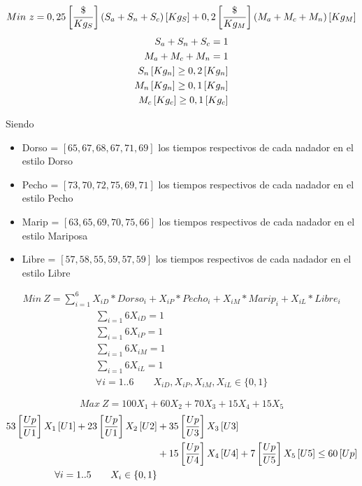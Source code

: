 \documentclass{tarea}
\begin{document}
\begin{homeworkProblem}[-1][Dulces]
\begin{equation}
  Min\ z = 0,25\left[ \frac{\$}{Kg_S} \right]\left( S_a + S_n + S_c \right)\left[ Kg_S \right] + 0,2\left[ \frac{\$}{Kg_M} \right]\left( M_a+M_c+M_n \right)\left[ Kg_M \right]
\end{equation}
\begin{align*}
  S_a + S_n + S_c = 1 \\
  M_a+M_c+M_n = 1 \\
  S_n \left[ Kg_n \right] \ge 0,2\left[ Kg_n \right] \\
  M_n \left[ Kg_n \right] \ge 0,1\left[ Kg_n \right] \\
  M_c \left[ Kg_c \right] \ge 0,1\left[ Kg_c \right] \\
\end{align*}
\end{homeworkProblem}


\begin{homeworkProblem}
Siendo
\begin{itemize}
 \item Dorso = $\left[65,67,68,67,71,69 \right]$ los tiempos respectivos de cada nadador en el estilo Dorso
 \item Pecho = $\left[73, 70, 72, 75, 69, 71 \right]$ los tiempos respectivos de cada nadador en el estilo Pecho
 \item Marip = $\left[63,65,69,70,75,66 \right]$ los tiempos respectivos de cada nadador en el estilo Mariposa
 \item Libre = $\left[57,58,55,59,57,59 \right]$ los tiempos respectivos de cada nadador en el estilo Libre
\end{itemize}
\begin{align*}
  Min\ Z = \sum_{i=1}^{6}{X_{iD}*Dorso_i + X_{iP}*Pecho_i + X_{iM}*Marip_i + X_{iL}*Libre_i}
\end{align*}
\begin{align*}
   \sum_{i=1}{6}{X_{iD}} = 1 \\
   \sum_{i=1}{6}{X_{iP}} = 1  \\
   \sum_{i=1}{6}{X_{iM}} = 1 \\
   \sum_{i=1}{6}{X_{iL}} = 1 \\
   \forall i=1..6\quad \quad X_{iD},X_{iP},X_{iM},X_{iL} \in \{0,1\}
\end{align*}
\end{homeworkProblem}


\begin{homeworkProblem}[-1][Operario]
\begin{equation}
  Max\ Z = 100X_1 + 60X_2 + 70X_3 + 15X_4 + 15X_5
\end{equation}
\begin{align*}
  53\left[ \frac{Up}{U1} \right]X_1\left[ U1 \right] + 23\left[ \frac{Up}{U1} \right]X_2\left[ U2 \right] &+ 35\left[ \frac{Up}{U3} \right]X_3\left[ U3 \right] \\
   &+ 15\left[ \frac{Up}{U4} \right]X_4\left[ U4 \right] + 7\left[ \frac{Up}{U5} \right]X_5\left[ U5 \right] \le 60\left[ Up \right] \\
  \forall i=1..5\quad \quad X_i \in \{0,1 \}
\end{align*}
\end{homeworkProblem}
\end{document}

